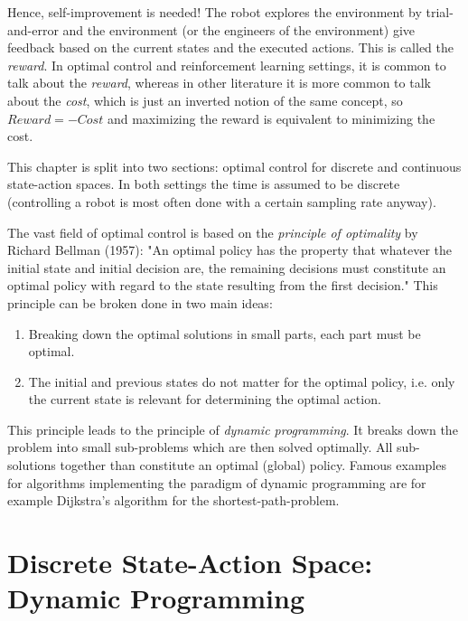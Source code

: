 	Hence, self-improvement is needed! The robot explores the environment by trial-and-error and the environment (or the engineers of the environment) give feedback based on the current states and the executed actions. This is called the \emph{reward}. In optimal control and reinforcement learning settings, it is common to talk about the \emph{reward}, whereas in other literature it is more common to talk about the \emph{cost}, which is just an inverted notion of the same concept, so \( \mathit{Reward} = -\mathit{Cost} \) and maximizing the reward is equivalent to minimizing the cost.

	This chapter is split into two sections: optimal control for discrete and continuous state-action spaces. In both settings the time is assumed to be discrete (controlling a robot is most often done with a certain sampling rate anyway).

	The vast field of optimal control is based on the \emph{principle of optimality} by Richard Bellman (1957): "An optimal policy has the property that whatever the initial state and initial decision are, the remaining decisions must constitute an optimal policy with regard to the state resulting from the first decision." This principle can be broken done in two main ideas:
	\begin{enumerate}
		\item Breaking down the optimal solutions in small parts, each part must be optimal.
		\item The initial and previous states do not matter for the optimal policy, i.e. only the current state is relevant for determining the optimal action.
	\end{enumerate}
	This principle leads to the principle of \emph{dynamic programming}. It breaks down the problem into small sub-problems which are then solved optimally. All sub-solutions together than constitute an optimal (global) policy. Famous examples for algorithms implementing the paradigm of dynamic programming are for example Dijkstra's algorithm for the shortest-path-problem.

	\section{Discrete State-Action Space: Dynamic Programming}
		\label{sec:discreteOptimalControl}


